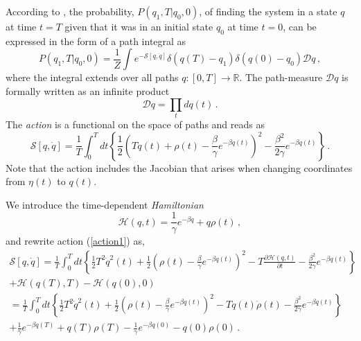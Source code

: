 \documentclass[11pt, a4paper]{article}
\newcommand{\dt}{\mathit{dt}}
\begin{document}


According to \cite{lau_2007_StateDepDiff}, the probability, $P(q_1,T|q_0,0)$, of finding the system in a state $q$ at time $t = T$ given that it was in an initial state $q_0$ at time $t = 0$, can be expressed in the form of a path integral as
\begin{equation}\label{pathint}
P(q_1,T|q_0,0)
=
\frac{1}{Z}
\int
e^{-{\mathcal S}[q,\dot q]}
\delta(q(T)-q_1)
\delta(q(0)-q_0)
\mathcal{D}q \,,
\end{equation}
where the integral extends over all paths $q:[0,T]\rightarrow \mathbb R$.
The path-measure $\mathcal Dq$ is formally written as an infinite product
\begin{equation}\label{pathmeasure_q}
{\mathcal Dq}
=
\prod_{t}
dq(t)\,.
\end{equation}
The {\em action} is a functional on the space of paths and reads as
\begin{equation}\label{action1}
{\mathcal S}[{q},\dot q]
=
\frac{1}{T}
\int_0^T \dt \left\{
\frac{1}{2}
\left(
    T\dot q(t)
    +
    \rho(t)
    -
    \frac{\beta}{\gamma}e^{-\beta q(t)}\right)^2
    -
    \frac{\beta^2}{2\gamma}e^{-\beta q(t)}
\right\} \,.
\end{equation}
Note that the action includes the Jacobian that arises when changing coordinates from ${\eta(t)}$ to $q(t)$.

We introduce the time-dependent {\em Hamiltonian}
\begin{equation}\label{H}
  \mathcal{H}(q,t)
  =
  \frac{1}{\gamma}e^{-\beta q}+q\rho(t)\,,
\end{equation}
and rewrite action (\ref{action1}) as,
\begin{multline}\label{action}
{\mathcal S}[{q},\dot q]
=
\frac{1}{T}
\int_0^T dt\left\{
    \frac{1}{2}
    T^2\dot q^2(t) +
    \frac{1}{2}
    \left(\rho(t)-\frac{\beta}{\gamma}e^{-\beta q(t)}\right)^2 -
    T\frac{\partial \mathcal{H}(q,t)}{\partial t} -
    \frac{\beta^2}{2\gamma}e^{-\beta q(t)}
\right\}
\\
+ \mathcal{H}(q(T),T) - \mathcal{H}(q(0),0)
\\
= \frac{1}{T}
\int_0^T dt\left\{
    \frac{1}{2}
    T^2\dot q^2(t) +
    \frac{1}{2}
    \left(\rho(t)-\frac{\beta}{\gamma}e^{-\beta q(t)}\right)^2 -
    Tq(t)\dot\rho(t) -
     \frac{\beta^2}{2\gamma}e^{-\beta q(t)}
\right\}
\\
+
    \frac{1}{\gamma}e^{-\beta q(T)}+q(T)\rho(T)
   -\frac{1}{\gamma}e^{-\beta q(0)}-q(0)\rho(0)
\,.
\end{multline}
\end{document}
